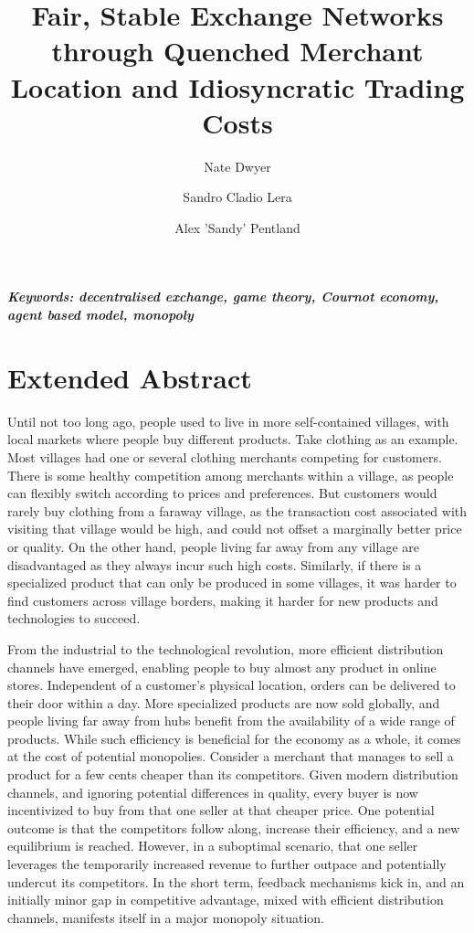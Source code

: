 \documentclass[a4paper,12pt]{article}
\title{Fair, Stable Exchange Networks through Quenched Merchant Location and Idiosyncratic Trading Costs}
\author[add1]{Nate Dwyer}
\author[add1]{Sandro Cladio Lera}
\author[add1]{Alex 'Sandy' Pentland}
\date{}
\begin{document}
\maketitle
\thispagestyle{fancy}

\vspace{-6em}
\begin{center}
\textbf{\textit{Keywords: decentralised exchange, game theory, Cournot economy, agent based model, monopoly}} 
\newline
\end{center}

\section*{Extended Abstract}

Until not too long ago, people used to live in more self-contained villages, with local markets where people buy different products. 
Take clothing as an example. Most villages had one or several clothing merchants competing for customers. 
There is some healthy competition among merchants within a village, as people can flexibly switch according to prices and preferences.
But customers would rarely buy clothing from a faraway village, as the transaction cost associated with visiting that village would be high, 
and could not offset a marginally better price or quality. 
On the other hand, people living far away from any village are disadvantaged as they always incur such high costs.
Similarly, if there is a specialized product that can only be produced in some villages, it was harder to find customers across village borders, 
making it harder for new products and technologies to succeed. 

From the industrial to the technological revolution, more efficient distribution channels have emerged, enabling people to buy almost any product in online stores. 
Independent of a customer's physical location, orders can be delivered to their door within a day. 
More specialized products are now sold globally, and people living far away from hubs benefit from the availability of a wide range of products. 
While such efficiency is beneficial for the economy as a whole, it comes at the cost of potential monopolies. 
Consider a merchant that manages to sell a product for a few cents cheaper than its competitors. 
Given modern distribution channels, and ignoring potential differences in quality, every buyer is now incentivized to buy from that one seller at that cheaper price.
One potential outcome is that the competitors follow along, increase their efficiency, and a new equilibrium is reached. 
However, in a suboptimal scenario, that one seller leverages the temporarily increased revenue to further outpace and potentially undercut its competitors. 
In the short term, feedback mechanisms kick in, and an initially minor gap in competitive advantage, mixed with efficient distribution channels, manifests itself in a major monopoly situation. 
\end{document}
